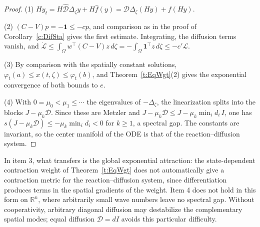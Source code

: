 \begin{proof}
(1) $Hy_t=H\widehat{\mathcal D}\Delta_\zeta y+H\widehat f(y)=\mathcal D\Delta_\zeta(Hy)+f(Hy)$.

(2) $(C-V)p=-\mathbf1\le-cp$, and comparison as in the proof of Corollary~\ref{c:DifSta} gives the first estimate. Integrating, the diffusion terms vanish, and $\dot{\mathcal L}\le\int_\Omega w^\top(C-V)z\,d\zeta=-\int_\Omega\mathbf1^\top z\,d\zeta\le-c'\mathcal L$.

(3) By comparison with the spatially constant solutions, $\varphi_t(a)\le x(t,\zeta)\le\varphi_t(b)$, and Theorem~\ref{t:EqWgt}(2) gives the exponential convergence of both bounds to $e$.

(4) With $0=\mu_0<\mu_1\le\cdots$ the eigenvalues of $-\Delta_\zeta$, the linearization splits into the blocks $J-\mu_k\mathcal D$. Since these are Metzler and $J-\mu_k\mathcal D\le J-\mu_k\min_id_i\,I$, one has $s(J-\mu_k\mathcal D)\le-\mu_k\min_id_i<0$ for $k\ge1$, a spectral gap. The constants are invariant, so the center manifold of the ODE is that of the reaction--diffusion system.
\end{proof}

In item 3, what transfers is the global exponential attraction: the state-dependent contraction weight of Theorem~\ref{t:EqWgt} does not automatically give a contraction metric for the reaction--diffusion system, since differentiation produces terms in the spatial gradients of the weight. Item 4 does not hold in this form on $\mathbb R^n$, where arbitrarily small wave numbers leave no spectral gap. Without cooperativity, arbitrary diagonal diffusion may destabilize the complementary spatial modes; equal diffusion $\mathcal D=dI$ avoids this particular difficulty.
\eeR

